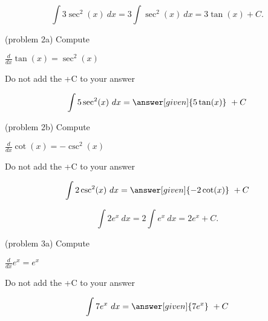 \documentclass{ximera}
\begin{document}
\begin{example}[example 2]
\[
\int 3\sec^2(x) \ dx = 3 \int \sec^2(x) \ dx = 3\tan(x) +C.
\]
\end{example}



\begin{problem}(problem 2a)
Compute

\begin{hint}
$\frac{d}{dx} \tan(x) = \sec^2(x)$
\end{hint}
\begin{hint}
\begin{center}
Do not add the +C to your answer
\end{center}
\end{hint}

\[
\int 5\sec^2(x) \ dx =
\answer[given]{5\tan(x)} \ +  C
\]
\end{problem}


\begin{problem}(problem 2b)
Compute

\begin{hint}
$\frac{d}{dx} \cot(x) = -\csc^2(x)$
\end{hint}
\begin{hint}
\begin{center}
Do not add the +C to your answer
\end{center}
\end{hint}

\[
\int 2\csc^2(x) \ dx =
\answer[given]{-2\cot(x)} \ +  C
\]
\end{problem}


\begin{example}[example 3]
\[
\int 2e^x \ dx = 2 \int e^x \ dx = 2e^x +C.
\]
\end{example}


\begin{problem}(problem 3a)
Compute

\begin{hint}
$\frac{d}{dx} e^x = e^x$
\end{hint}
\begin{hint}
\begin{center}
Do not add the +C to your answer
\end{center}
\end{hint}

\[
\int 7e^x \ dx =
\answer[given]{7e^x} \ +  C
\]
\end{problem}
\end{document}
